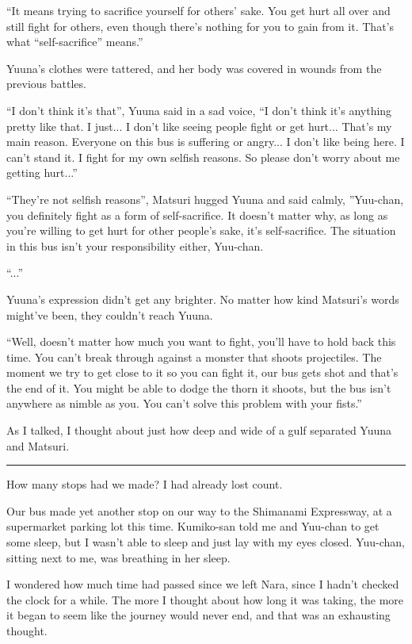 ``It means trying to sacrifice yourself for others' sake. You get hurt all over and still fight for others, even though there's nothing for you to gain from it. That's what ``self-sacrifice'' means.''

Yuuna's clothes were tattered, and her body was covered in wounds from the previous battles.

``I don't think it's that'', Yuuna said in a sad voice, ``I don't think it's anything pretty like that. I just... I don't like seeing people fight or get hurt... That's my main reason. Everyone on this bus is suffering or angry... I don't like being here. I can't stand it. I fight for my own selfish reasons. So please don't worry about me getting hurt...''

``They're not selfish reasons'', Matsuri hugged Yuuna and said calmly, ''Yuu-chan, you definitely fight as a form of self-sacrifice. It doesn't matter why, as long as you're willing to get hurt for other people's sake, it's self-sacrifice. The situation in this bus isn't your responsibility either, Yuu-chan.

``...''

Yuuna's expression didn't get any brighter. No matter how kind Matsuri's words might've been, they couldn't reach Yuuna.

``Well, doesn't matter how much you want to fight, you'll have to hold back this time. You can't break through against a monster that shoots projectiles. The moment we try to get close to it so you can fight it, our bus gets shot and that's the end of it. You might be able to dodge the thorn it shoots, but the bus isn't anywhere as nimble as you. You can't solve this problem with your fists.''

As I talked, I thought about just how deep and wide of a gulf separated Yuuna and Matsuri.

\vspace{\baselineskip}
\hrule
\vspace{\baselineskip}

How many stops had we made? I had already lost count.

Our bus made yet another stop on our way to the Shimanami Expressway, at a supermarket parking lot this time. Kumiko-san told me and Yuu-chan to get some sleep, but I wasn't able to sleep and just lay with my eyes closed. Yuu-chan, sitting next to me, was breathing in her sleep.

I wondered how much time had passed since we left Nara, since I hadn't checked the clock for a while. The more I thought about how long it was taking, the more it began to seem like the journey would never end, and that was an exhausting thought.

